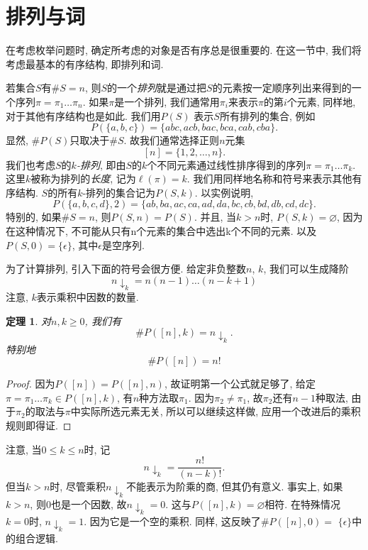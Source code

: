 \documentclass{ctexbook}
\newtheorem{thm}{定理}[section]
\begin{document}
\section{排列与词}
在考虑枚举问题时, 确定所考虑的对象是否有序总是很重要的. 在这一节中, 我们将考虑最基本的有序结构, 即排列和词.

若集合$S$有$\# S=n$, 则$S$的一个\textsl{排列}就是通过把$S$的元素按一定顺序列出来得到的一个序列$\pi=\pi_{1} \ldots \pi_{n}$.
如果$\pi$是一个排列, 我们通常用$\pi_{i}$来表示$\pi$的第$i$个元素, 同样地, 对于其他有序结构也是如此. 我们用$P(S)$
表示$S$所有排列的集合, 例如
$$P(\{a, b, c\})=\{a b c, a c b, b a c, b c a, c a b, c b a\}.$$
显然, $\# P(S)$只取决于$\# S $. 故我们通常选择正则$n$元集
$$[n]=\{1,2, \ldots, n\}.$$
我们也考虑$S$的\textsl{$k$-排列}, 即由$S$的$k$个不同元素通过线性排序得到的序列$\pi=\pi_{1} \ldots \pi_{k}$.
这里$k$被称为排列的\textsl{长度}, 记为$\ell(\pi)=k$. 我们用同样地名称和符号来表示其他有序结构. $S$的所有$k$-排列的集合记为$P(S, k)$. 以实例说明,
$$P(\{a, b, c, d\}, 2)=\{a b, b a, a c, c a, a d, d a, b c, c b, b d, d b, c d, d c\}.$$
特别的, 如果$\# S=n$, 则$P(S, n)=P(S)$. 并且, 当$k>n$时, $P(S, k)=\varnothing$, 因为在这种情况下, 不可能从只有n个元素的集合中选出k个不同的元素.
以及$P(S, 0)=\{\epsilon\}$, 其中$\epsilon$是空序列.

为了计算排列, 引入下面的符号会很方便. 给定非负整数$n$,  $k$, 我们可以生成降阶
$$n \downarrow_{k}=n(n-1) \ldots(n-k+1)$$
注意, $k$表示乘积中因数的数量.
    \begin{thm}
    	\textsl{对}$n, k \geqslant 0$, \textsl{我们有}
    		$$\# P([n], k)=n \downarrow_{k}.$$
    		\textsl{特别地}
    		$$\# P([n])=n !$$
    \end{thm}
    \begin{proof}
    	因为$P([n])=P([n], n)$, 故证明第一个公式就足够了, 给定$\pi=\pi_{1} \ldots \pi_{k} \in P([n], k)$, 有$n$种方法取$\pi_{1}$.
    	因为$\pi_{2} \neq \pi_{1}$, 故$\pi_{2}$还有$n-1$种取法, 由于$\pi_{2}$的取法与$\pi$中实际所选元素无关, 所以可以继续这样做, 应用一个改进后的乘积规则即得证.
    \end{proof}
注意, 当$0 \leqslant k \leqslant n$时, 记
\begin{equation}
n \downarrow_{k}=\frac{n !}{(n-k) !}.
\end{equation}
但当$k>n$时, 尽管乘积$n \downarrow_k$不能表示为阶乘的商, 但其仍有意义. 事实上, 如果$k>n$, 则0也是一个因数, 故$n \downarrow_{k}=0$.
这与$P([n], k)=\varnothing $相符. 在特殊情况$k=0$时, $n \downarrow_{k}=1$. 因为它是一个空的乘积. 同样, 这反映了$\# P([n], 0)=$ $\{\epsilon\}$中的组合逻辑.
\end{document}

